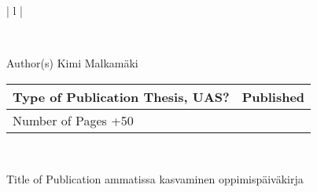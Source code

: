 \begin{tabular}{ | l | }

    \\

    \hline
    \begin{minipage}[b]{6cm}
        Author(s)
        \newline
        Kimi Malkamäki 
    \end{minipage}%
    \begin{minipage}{8.5cm}
        \begin{tabular}{ | l | c | }
            \begin{minipage}[t][1cm][t]{4.25cm}
                Type of Publication 
                \newline
                Thesis, UAS?
            \end{minipage} & %
            \begin{minipage}{3.62cm}
                Published
                \newline
                2024
            \end{minipage} \\ \hline%
            \begin{minipage}[t][1cm][t]{4.25cm}
                Number of Pages
                \newline 
                31+50
            \end{minipage}
            &  \\ \hline
        \end{tabular}
    \end{minipage}%
      \\ \hline

    \begin{minipage}[t][2cm][t]{8cm}
    Title of Publication
        \newline 
    ammatissa kasvaminen 
        \newline 
    oppimispäiväkirja  
    \end{minipage}\\ \hline


\end{tabular}
